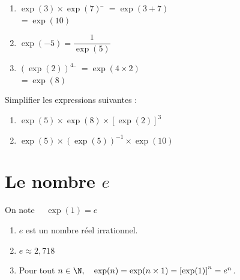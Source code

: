 \documentclass[a4paper,11pt,cours]{nsi} %
\begin{document}
\begin{exemple}[s]
\begin{multicols}{2}
	\begin{enumerate}[label=\textbullet]
		\item 	\begin{tabbing}
			$\exp(3)\times\exp(7)$	\= $=\exp(3+7)$\\
			\>	$=\exp(10)$
		\end{tabbing}
		\item 	$\exp(-5)=\dfrac{1}{\exp(5)}$
		\item	\begin{tabbing}
			$\left(\exp(2)\right)^4$	\= $=\exp(4\times 2)$\\
			\>	$=\exp(8)$
		\end{tabbing}
	\end{enumerate}	
\end{multicols}
\end{exemple}

\begin{exercice}[]
	Simplifier les expressions suivantes :
	\begin{multicols}{2}
		\begin{enumerate}[]
			\item 	$\exp(5)\times \exp(8) \times \left[\exp(2)\right]^3$\\[0.5em]
			\item 	$\exp(5)\times \left(\exp(5)\right)^{-1}\times\exp(10)$\\[0.5em]
		\end{enumerate}
	\end{multicols}
\end{exercice}

\section{Le nombre $e$}
\begin{definition}[ ]
	On note $\quad \exp(1)=e$
\end{definition}

\begin{remarque}[s]
	\begin{enumerate}[label=\textbullet]
		\item 	$e$ est un nombre réel irrationnel.
		\item 	$e \approx 2,718$
		\item	Pour tout $n\in\N, \quad \exp(n)=\exp(n\times 1)=\left[\exp(1)\right]^n=e^n$.	
	\end{enumerate}
\end{remarque}
	
\end{document}
